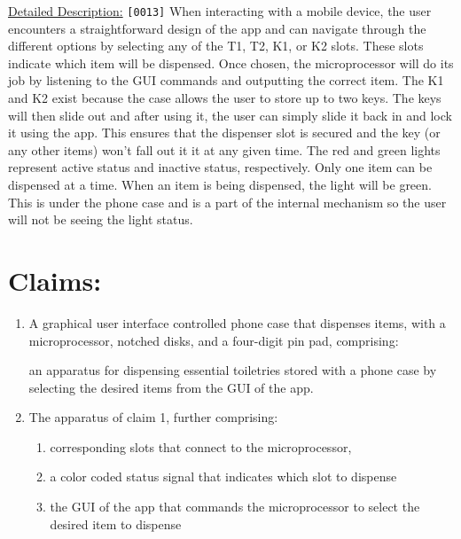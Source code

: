 \documentclass[11pt]{article}
\begin{document}
{\nonindent \underline{Detailed Description:} \verb|[0013]| 
When interacting with a mobile device, the user encounters a straightforward design of the app and can navigate through the different options by selecting any of the T1, T2, K1, or K2 slots. These slots indicate which item will be dispensed. Once chosen, the microprocessor will do its job by listening to the GUI commands and outputting the correct item. The K1 and K2 exist because the case allows the user to store up to two keys. The keys will then slide out and after using it, the user can simply slide it back in and lock it using the app. This ensures that the dispenser slot is secured and the key (or any other items) won’t fall out it it at any given time. The red and green lights represent active status and inactive status, respectively. Only one item can be dispensed at a time. When an item is being dispensed, the light will be green. This is under the phone case and is a part of the internal mechanism so the user will not be seeing the light status. 

\newline

\section*{Claims:} 

\begin{enumerate}
    \item {A graphical user interface controlled phone case that dispenses items, with a microprocessor, notched disks, and a four-digit pin pad, comprising:
        \begin{enumerate}[label=(\alph*)]
         an apparatus for dispensing essential toiletries stored with a phone case by selecting the desired items from the GUI of the app.
        \end{enumerate}
    }
    
    \item{The apparatus of claim 1, further comprising:
        \begin{enumerate}[label=(\alph*)]
        \item{corresponding slots that connect to the microprocessor,}
        \item{ a color coded status signal that indicates which slot to dispense}
        \item{the GUI of the app that commands the microprocessor to select the desired item to dispense}
        \end{enumerate}
    }
    

\end{enumerate}}
\end{document}
